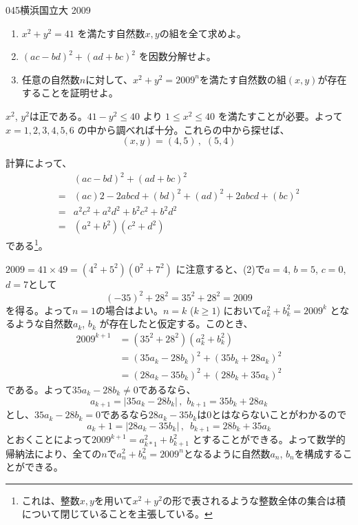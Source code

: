 \begin{thm}{045}{}{横浜国立大 2009}
 \begin{enumerate}
  \item $x^2+y^2=41$ を満たす自然数$x,y$の組を全て求めよ。
  \item $(ac-bd)^2+(ad+bc)^2$ を因数分解せよ。
  \item 任意の自然数$n$に対して、$x^2+y^2=2009^n$を満たす自然数の組$(x,y)$が存在することを証明せよ。
 \end{enumerate}
\end{thm}

$x^2$, $y^2$は正である。$41-y^2\le 40$ より $1\le x^2\le 40$ を満たすことが必要。よって$x=1,2,3,4,5,6$ の中から調べれば十分。これらの中から探せば、
\[ (x,y)=(4,5)\,,\,\, (5,4) \]

計算によって、
\begin{align*}
 &(ac-bd)^2+(ad+bc)^2 \\
 =& (ac)2-2abcd+(bd)^2+(ad)^2+2abcd+(bc)^2 \\
 =& a^2c^2+a^2d^2+b^2c^2+b^2d^2 \\
 =& (a^2+b^2)(c^2+d^2)
\end{align*}
である\footnote{これは、整数$x,y$を用いて$x^2+y^2$の形で表されるような整数全体の集合は積について閉じていることを主張している。}。

$2009=41\times49=(4^2+5^2)(0^2+7^2)$ に注意すると、(2)で$a=4$, $b=5$, $c=0$, $d=7$として
\[ (-35)^2+28^2=35^2+28^2=2009 \]
を得る。よって$n=1$の場合はよい。$n=k$ ($k\ge 1$) において$a_k^2+b_k^2=2009^k$ となるような自然数$a_k$, $b_k$ が存在したと仮定する。このとき、
\begin{align*}
 2009^{k+1}&=(35^2+28^2)(a_k^2+b_k^2) \\
 &=(35a_k-28b_k)^2+(35b_k+28a_k)^2 \\
 &=(28a_k-35b_k)^2+(28b_k+35a_k)^2
\end{align*}
である。よって$35a_k-28b_k\neq 0$であるなら、
\[ a_{k+1}=|35a_k-28b_k| \,,\,\, b_{k+1}=35b_k+28a_k \]
とし、$35a_k-28b_k=0$であるなら$28a_k-35b_k$は0とはならないことがわかるので
\[ a_k+1=|28a_k-35b_k| \,,\,\,\, b_{k+1}=28b_k+35a_k \]
とおくことによって$2009^{k+1}=a_{k*1}^2+b_{k+1}^2$ とすることができる。よって数学的帰納法により、全ての$n$で$a_n^2+b_n^2=2009^n$となるように自然数$a_n$, $b_n$を構成することができる。